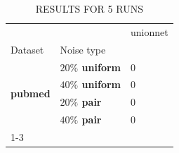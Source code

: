 \begin{table}
\caption{RESULTS FOR 5 RUNS}
\begin{tabular}{lll}
\toprule
 &  & unionnet \\
Dataset & Noise type &  \\
\midrule
\multirow[t]{4}{*}{\textbf{pubmed}} & \textbf{$ 20 \% $ uniform} & 0 \\
\textbf{} & \textbf{$ 40 \% $ uniform} & 0 \\
\textbf{} & \textbf{$ 20 \% $ pair} & 0 \\
\textbf{} & \textbf{$ 40 \% $ pair} & 0 \\
\cline{1-3}
\bottomrule
\end{tabular}
\end{table}
